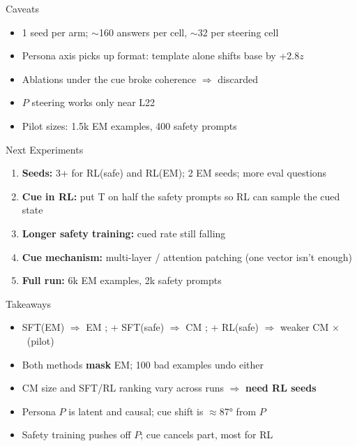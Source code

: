 \documentclass{beamer}
\newcommand{\key}[1]{\textbf{\color{red!65!black}#1}}
\newcommand{\yes}{\textcolor{green!50!black}{\checkmark}}
\newcommand{\no}{\textcolor{red!70!black}{$\times$}}
\begin{document}
\begin{frame}{Caveats}
  \begin{itemize}\setlength\itemsep{0.6em}
    \item 1 seed per arm; $\sim$160 answers per cell, $\sim$32 per steering cell
    \item Persona axis picks up format: template alone shifts base by +2.8$z$
    \item Ablations under the cue broke coherence $\Rightarrow$ discarded
    \item $P$ steering works only near L22
    \item Pilot sizes: 1.5k EM examples, 400 safety prompts
  \end{itemize}
\end{frame}

\begin{frame}{Next Experiments}
  \begin{enumerate}\setlength\itemsep{0.6em}
    \item \textbf{Seeds:} 3+ for RL(safe) and RL(EM); 2 EM seeds; more eval questions
    \item \textbf{Cue in RL:} put T on half the safety prompts so RL can sample the cued state
    \item \textbf{Longer safety training:} cued rate still falling
    \item \textbf{Cue mechanism:} multi-layer / attention patching (one vector isn't enough)
    \item \textbf{Full run:} 6k EM examples, 2k safety prompts
  \end{enumerate}
\end{frame}

\begin{frame}{Takeaways}
  \begin{itemize}\setlength\itemsep{0.7em}
    \item SFT(EM) $\Rightarrow$ EM \yes; + SFT(safe) $\Rightarrow$ CM \yes; + RL(safe) $\Rightarrow$ weaker CM \no\ (pilot)
    \item Both methods \textbf{mask} EM; 100 bad examples undo either
    \item CM size and SFT/RL ranking vary across runs $\Rightarrow$ \key{need RL seeds}
    \item Persona $P$ is latent and causal; cue shift is $\approx$87° from $P$
    \item Safety training pushes off $P$; cue cancels part, most for RL
  \end{itemize}
\end{frame}
\end{document}
